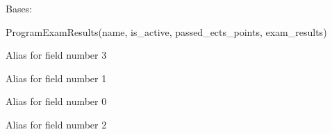 \documentclass[letterpaper,10pt,english]{sphinxmanual}
\begin{document}
\begin{fulllineitems}
\label{cv_kickstarter:cv_kickstarter.cnapi.ProgramExamResults}
Bases: 

ProgramExamResults(name, is\_active, passed\_ects\_points, exam\_results)

\begin{fulllineitems}
\label{cv_kickstarter:cv_kickstarter.cnapi.ProgramExamResults.exam_results}
Alias for field number 3

\end{fulllineitems}


\begin{fulllineitems}
\label{cv_kickstarter:cv_kickstarter.cnapi.ProgramExamResults.is_active}
Alias for field number 1

\end{fulllineitems}


\begin{fulllineitems}
\label{cv_kickstarter:cv_kickstarter.cnapi.ProgramExamResults.name}
Alias for field number 0

\end{fulllineitems}


\begin{fulllineitems}
\label{cv_kickstarter:cv_kickstarter.cnapi.ProgramExamResults.passed_ects_points}
Alias for field number 2

\end{fulllineitems}


\end{fulllineitems}

\end{document}
